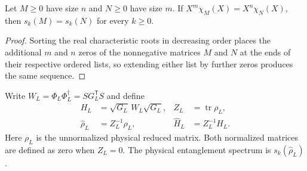 \begin{lemma}%
    \label{thm:half_chain_padded_charpoly}
    \leanok
    Let $M\geq0$ have size $n$ and $N\geq0$ have size $m$.
    If $X^m\chi_M(X)=X^n\chi_N(X)$, then $s_k(M)=s_k(N)$ for every
    $k\geq0$.
\end{lemma}

\begin{proof}
    \leanok
    Sorting the real characteristic roots in decreasing order places the
    additional $m$ and $n$ zeros of the nonnegative matrices $M$ and $N$ at
    the ends of their respective ordered lists, so extending either list by
    further zeros produces the same sequence.
\end{proof}

\begin{definition}%
    \label{def:half_chain_positive_density}
    \leanok
    Write $W_L=\Phi_L\Phi_L^\dagger=SG_L^{\mathsf T}S$ and define
    \begin{align}
        H_L            & = \sqrt{G_L}\,W_L\sqrt{G_L},
                       & Z_L                          & = \operatorname{tr}\rho_L,
        \label{eq:half_chain_positive_density}                                     \\
        \widehat\rho_L & = Z_L^{-1}\rho_L,
                       & \widehat H_L                 & = Z_L^{-1}H_L.
        \label{eq:half_chain_normalized_density}
    \end{align}
    Here $\rho_L$ is the unnormalized physical reduced matrix.
    Both normalized matrices are defined as zero when $Z_L=0$.
    The physical entanglement spectrum is $s_k(\widehat\rho_L)$.
\end{definition}

